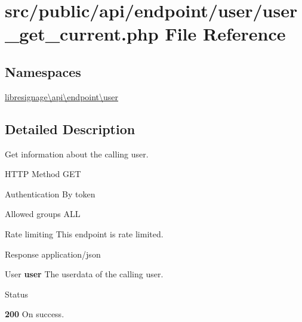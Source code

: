 \hypertarget{src_2public_2api_2endpoint_2user_2user__get__current_8php}{}\section{src/public/api/endpoint/user/user\+\_\+get\+\_\+current.php File Reference}
\label{src_2public_2api_2endpoint_2user_2user__get__current_8php}
\subsection*{Namespaces}
\begin{DoxyCompactItemize}
\item 
 \hyperlink{namespacelibresignage_1_1api_1_1endpoint_1_1user}{libresignage\textbackslash{}api\textbackslash{}endpoint\textbackslash{}user}
\end{DoxyCompactItemize}


\subsection{Detailed Description}
Get information about the calling user.

\begin{DoxyParagraph}{H\+T\+TP Method}
G\+ET 
\end{DoxyParagraph}
\begin{DoxyParagraph}{Authentication}
By token 
\end{DoxyParagraph}
\begin{DoxyParagraph}{Allowed groups}
{\ttfamily A\+LL} 
\end{DoxyParagraph}
\begin{DoxyParagraph}{Rate limiting}
This endpoint is rate limited.
\end{DoxyParagraph}
\begin{DoxyParagraph}{Response}
application/json
\begin{DoxyItemize}
\item {\ttfamily User} {\bfseries user} The userdata of the calling user.
\end{DoxyItemize}
\end{DoxyParagraph}
\begin{DoxyParagraph}{Status}

\begin{DoxyItemize}
\item {\bfseries 200} On success. 
\end{DoxyItemize}
\end{DoxyParagraph}
